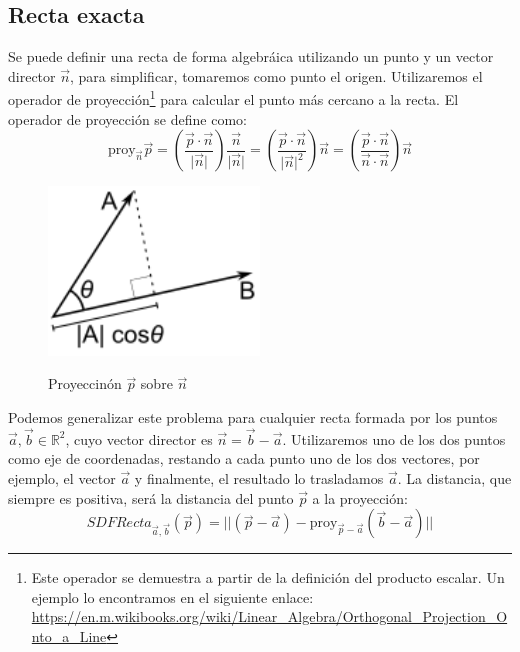 \subsection{Recta exacta}
Se puede definir una recta de forma algebráica utilizando un punto y un vector director \(\Vec{n}\), para simplificar, tomaremos como punto el origen. Utilizaremos el operador de proyección\footnote{Este operador se demuestra a partir de la definición del producto escalar. Un ejemplo lo encontramos en el siguiente enlace:  \url{https://en.m.wikibooks.org/wiki/Linear_Algebra/Orthogonal_Projection_Onto_a_Line}}
para calcular el punto más cercano a la recta. El operador de proyección se define como:
\[ \text{proy}_{\Vec{n}}\Vec{p}=\left(\dfrac{\Vec{p}\cdot\Vec{n}}{\vert \Vec{n}\vert}\right)\dfrac{\Vec{n}}{\vert\Vec{n}\vert}=\left(\dfrac{\Vec{p}\cdot\Vec{n}}{\vert \Vec{n}\vert^2}\right)\Vec{n}=\left(\dfrac{\Vec{p}\cdot \Vec{n}}{\Vec{n}\cdot \Vec{n}}\right)\Vec{n}\]

\begin{figure}[H]
  \centering
  \captionsetup{justification=centering}%
  \includegraphics[width=0.5\textwidth]{secciones/imagenes/proyeccion.png}\label{fig:proyection}
  \caption{Proyeccinón \(\Vec{p}\) sobre \(\Vec{n}\)}
\end{figure}

Podemos generalizar este problema para cualquier recta formada por los puntos \(\Vec{a},\Vec{b}\in\mathbb{R}^2\), cuyo vector director es 
\(\Vec{n}=\Vec{b}-\Vec{a}\). Utilizaremos uno de los dos puntos como eje de coordenadas, restando a cada punto uno de los dos vectores, por ejemplo, el vector \(\Vec{a}\) y finalmente, el resultado lo trasladamos \(\Vec{a}\). La distancia, que siempre es positiva, será la distancia del punto \(\Vec{p}\) a la proyección:
\[SDFRecta_{\Vec{a},\Vec{b}}(\Vec{p})=\vert\vert (\Vec{p}-\Vec{a}) - \text{proy}_{\Vec{p}-\Vec{a}}\left(\Vec{b}-\Vec{a}\right)\vert\vert\]


